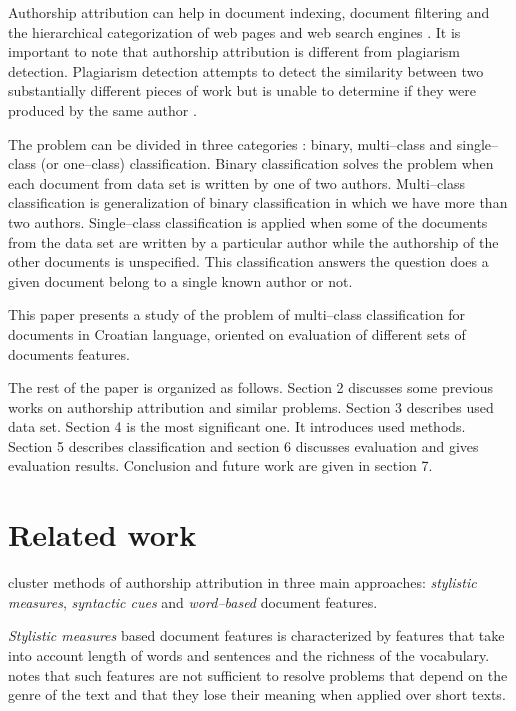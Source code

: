 \documentclass[11pt,english]{article}
\begin{document}
\begin{multicols}{2}
Authorship attribution can help in document indexing, document filtering and the
hierarchical categorization of web pages and web search engines
\citep{luyckx2005shallow}. It is important to note that authorship attribution
is different from plagiarism detection. Plagiarism detection attempts to detect the
similarity between two substantially different pieces of work but is unable to
determine if they were produced by the same author \citep{de2001mining}.

The problem can be divided in three categories \citep{zhao2005effective}: binary,
multi--class and single--class (or one--class) classification. Binary
classification solves the problem when each document from data set is written by
one of two authors. Multi--class classification is generalization of binary
classification in which we have more than two authors. Single--class
classification is applied when some of the documents from the data set are written by
a particular author while the authorship of the other documents is unspecified.
This classification answers the question does a given document belong to
a single known author or not.

This paper presents a study of the problem of multi--class classification for
documents in Croatian language, oriented on evaluation of different sets of
documents features.

The rest of the paper is organized as follows. Section 2 discusses some previous
works on authorship attribution and similar problems. Section 3 describes used
data set. Section 4 is the most significant one. It introduces used methods.
Section 5 describes classification and section 6 discusses evaluation and
gives evaluation results. Conclusion and future work are given in section 7.

\section{Related work}
\citet{coyotl2006authorship} cluster methods of authorship attribution in three
main approaches: \emph{stylistic measures}, \emph{syntactic cues} and
\emph{word--based} document features.

\emph{Stylistic measures} based document features is characterized by features
that take into account length of words and sentences and the
richness of the vocabulary. \citet{coyotl2006authorship} notes that such features are not
sufficient to resolve problems that depend on the genre of the text and that they
lose their meaning when applied over short texts.


\end{multicols}
\end{document}
